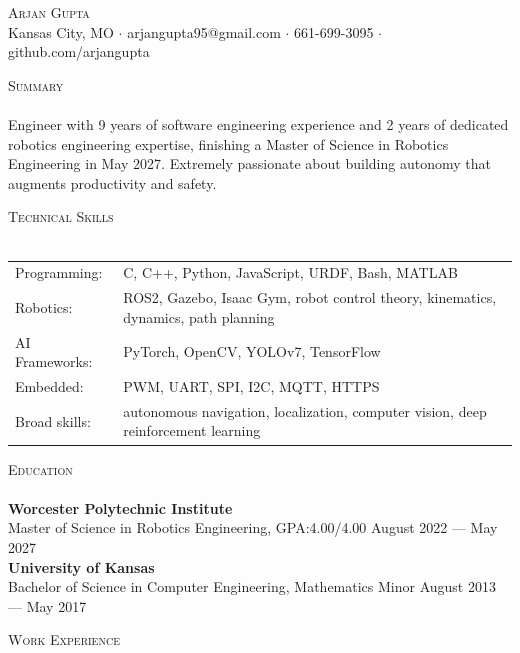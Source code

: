 \documentclass[a4paper]{article}
\newcommand{\lineunder} {
    \vspace*{-8pt} \\
    \hspace*{-18pt} \hrulefill \\
}
\newcommand{\header} [1] {
    {\hspace*{-18pt}\vspace*{6pt} \textsc{#1}}
    \vspace*{-6pt} \lineunder
}
\begin{document}
\vspace*{-40pt}

    

\vspace*{-10pt}
\begin{center}
	{\Huge \scshape {Arjan Gupta}}\\
	Kansas City, MO $\cdot$ arjangupta95@gmail.com $\cdot$ 661-699-3095 $\cdot$ github.com/arjangupta\\
\end{center}

\header{Summary}
\vspace{2mm}
Engineer with 9 years of software engineering experience and 2 years of dedicated robotics engineering expertise, finishing a Master of Science in Robotics Engineering in May 2027. Extremely passionate about building autonomy that augments productivity and safety.
\vspace{3mm}

\header{Technical Skills}
\vspace{2mm}
\begin{tabular}{ l l }
	Programming: & C, C++, Python, JavaScript, URDF, Bash, MATLAB \\
    Robotics: & ROS2, Gazebo, Isaac Gym, robot control theory, kinematics, dynamics, path planning \\
    AI Frameworks: & PyTorch, OpenCV, YOLOv7, TensorFlow \\
    Embedded:             & PWM, UART, SPI, I2C, MQTT,  HTTPS \\
    Broad skills: & autonomous navigation, localization, computer vision, deep reinforcement learning
\end{tabular}
\vspace{2mm}

\header{Education}
\textbf{Worcester Polytechnic Institute}\\
Master of Science in Robotics Engineering, GPA:\@ 4.00/4.00 \hfill August 2022 --- May 2027\\
\vspace{2mm}
\textbf{University of Kansas}\\
Bachelor of Science in Computer Engineering, Mathematics Minor \hfill August 2013 --- May 2017\\

\vspace{3mm}

\header{Work Experience}
\vspace{1mm}
\end{document}
